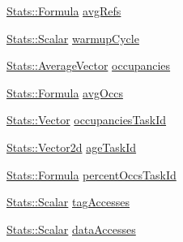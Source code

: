 \begin{DoxyCompactItemize}
\item 
\hyperlink{classStats_1_1Formula}{Stats::Formula} \hyperlink{group__CacheStatistics_gadbcb32891448d652807958d7d79cac39}{avgRefs}
\item 
\hyperlink{classStats_1_1Scalar}{Stats::Scalar} \hyperlink{group__CacheStatistics_ga2607cf0f839148422c1a78a9e21e2c29}{warmupCycle}
\item 
\hyperlink{classStats_1_1AverageVector}{Stats::AverageVector} \hyperlink{group__CacheStatistics_ga5626c7c93bb670e27e205ceba0240361}{occupancies}
\item 
\hyperlink{classStats_1_1Formula}{Stats::Formula} \hyperlink{group__CacheStatistics_ga9e42737de532cd164b91f1217862d1ce}{avgOccs}
\item 
\hyperlink{classStats_1_1Vector}{Stats::Vector} \hyperlink{group__CacheStatistics_ga6fa3359c33f65a569c3e2adc8d04dc26}{occupanciesTaskId}
\item 
\hyperlink{classStats_1_1Vector2d}{Stats::Vector2d} \hyperlink{group__CacheStatistics_gac02dc8ce25ce56af2d9038844ba89d99}{ageTaskId}
\item 
\hyperlink{classStats_1_1Formula}{Stats::Formula} \hyperlink{group__CacheStatistics_ga39817ed7d6dd5fa7b0a2eb2c693b223d}{percentOccsTaskId}
\item 
\hyperlink{classStats_1_1Scalar}{Stats::Scalar} \hyperlink{group__CacheStatistics_ga42eda9fe19a58cfd6ed7aaa7427664e4}{tagAccesses}
\item 
\hyperlink{classStats_1_1Scalar}{Stats::Scalar} \hyperlink{group__CacheStatistics_gad8dad26f755f9db669fc2b8dab657c0a}{dataAccesses}
\end{DoxyCompactItemize}


